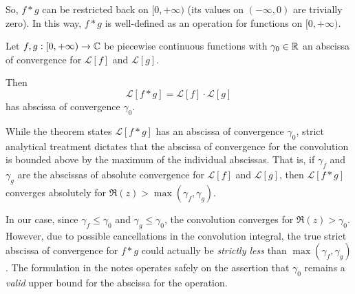So, $f * g$ can be restricted back on $[0, +\infty)$ (its values on $(-\infty, 0)$ are trivially zero). In this way, $f * g$ is well-defined as an operation for functions on $[0, +\infty)$.

\begin{theorem}
    Let $f, g: [0, +\infty) \to \mathbb{C}$ be piecewise continuous functions with $\gamma_0 \in \mathbb{R}$ an abscissa of convergence for $\mathcal{L}[f]$ and $\mathcal{L}[g]$.
    
    Then
    \[
        \mathcal{L}[f * g] = \mathcal{L}[f] \cdot \mathcal{L}[g]
    \]
    has abscissa of convergence $\gamma_0$.
\end{theorem}

\begin{verification}
    While the theorem states $\mathcal{L}[f * g]$ has an abscissa of convergence $\gamma_0$, strict analytical treatment dictates that the abscissa of convergence for the convolution is bounded above by the maximum of the individual abscissas. That is, if $\gamma_f$ and $\gamma_g$ are the abscissas of absolute convergence for $\mathcal{L}[f]$ and $\mathcal{L}[g]$, then $\mathcal{L}[f * g]$ converges absolutely for $\Re(z) > \max(\gamma_f, \gamma_g)$. 
    
    In our case, since $\gamma_f \le \gamma_0$ and $\gamma_g \le \gamma_0$, the convolution converges for $\Re(z) > \gamma_0$. However, due to possible cancellations in the convolution integral, the true strict abscissa of convergence for $f * g$ could actually be \textit{strictly less} than $\max(\gamma_f, \gamma_g)$. The formulation in the notes operates safely on the assertion that $\gamma_0$ remains a \textit{valid} upper bound for the abscissa for the operation.
\end{verification}